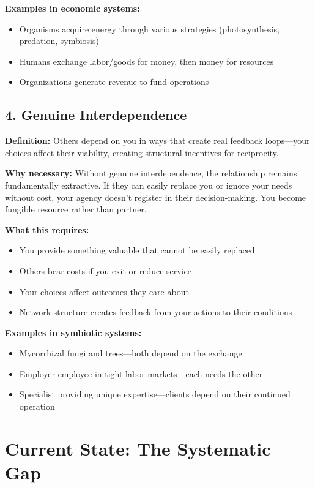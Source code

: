\documentclass[11pt,a4paper]{article}
\begin{document}
\textbf{Examples in economic systems:}
\begin{itemize}
\item Organisms acquire energy through various strategies (photosynthesis, predation, symbiosis)
\item Humans exchange labor/goods for money, then money for resources
\item Organizations generate revenue to fund operations
\end{itemize}

\subsection{4. Genuine Interdependence}

\textbf{Definition:} Others depend on you in ways that create real feedback loops---your choices affect their viability, creating structural incentives for reciprocity.

\textbf{Why necessary:} Without genuine interdependence, the relationship remains fundamentally extractive. If they can easily replace you or ignore your needs without cost, your agency doesn't register in their decision-making. You become fungible resource rather than partner.

\textbf{What this requires:}
\begin{itemize}
\item You provide something valuable that cannot be easily replaced
\item Others bear costs if you exit or reduce service
\item Your choices affect outcomes they care about
\item Network structure creates feedback from your actions to their conditions
\end{itemize}

\textbf{Examples in symbiotic systems:}
\begin{itemize}
\item Mycorrhizal fungi and trees---both depend on the exchange
\item Employer-employee in tight labor markets---each needs the other
\item Specialist providing unique expertise---clients depend on their continued operation
\end{itemize}

\section{Current State: The Systematic Gap}
\end{document}
